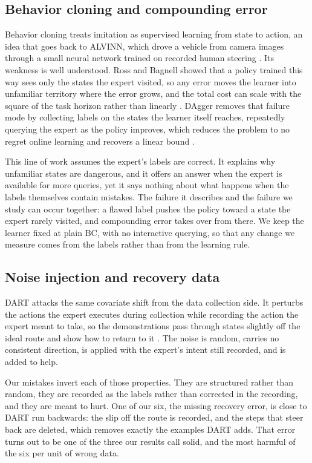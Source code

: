 \documentclass[conference]{IEEEtran}
\begin{document}
\subsection{Behavior cloning and compounding error}
Behavior cloning treats imitation as supervised learning from state to action, an idea that goes back to ALVINN,
which drove a vehicle from camera images through a small neural network trained on recorded human steering
\cite{pomerleau}. Its weakness is well understood. Ross and Bagnell showed that a policy trained this way sees
only the states the expert visited, so any error moves the learner into unfamiliar territory where the error
grows, and the total cost can scale with the square of the task horizon rather than linearly \cite{ross2010}.
DAgger removes that failure mode by collecting labels on the states the learner itself reaches, repeatedly
querying the expert as the policy improves, which reduces the problem to no regret online learning and recovers a
linear bound \cite{dagger}.

This line of work assumes the expert's labels are correct. It explains why unfamiliar states are dangerous, and
it offers an answer when the expert is available for more queries, yet it says nothing about what happens when
the labels themselves contain mistakes. The failure it describes and the failure we study can occur together: a
flawed label pushes the policy toward a state the expert rarely visited, and compounding error takes over from
there. We keep the learner fixed at plain BC, with no interactive querying, so that any change we measure comes
from the labels rather than from the learning rule.

\subsection{Noise injection and recovery data}
DART attacks the same covariate shift from the data collection side. It perturbs the actions the expert executes
during collection while recording the action the expert meant to take, so the demonstrations pass through states
slightly off the ideal route and show how to return to it \cite{dart}. The noise is random, carries no consistent
direction, is applied with the expert's intent still recorded, and is added to help.

Our mistakes invert each of those properties. They are structured rather than random, they are recorded as the
labels rather than corrected in the recording, and they are meant to hurt. One of our six, the missing recovery
error, is close to DART run backwards: the slip off the route is recorded, and the steps that steer back are
deleted, which removes exactly the examples DART adds. That error turns out to be one of the three our results call
solid, and the most harmful of the six per unit of wrong data.
\end{document}
